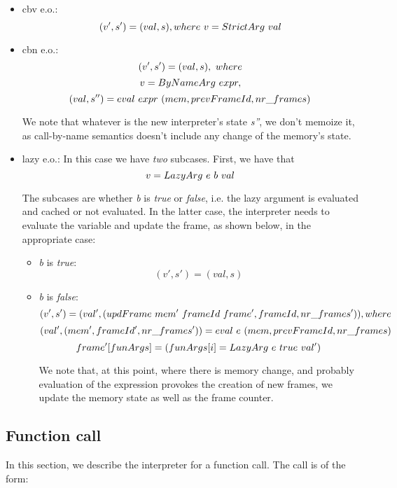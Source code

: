 \documentclass[diploma]{softlab-thesis}
\begin{document}
  \begin{itemize}
    \item cbv e.o.: \[(v', s') = (val, s), where \hfill\ v = StrictArg \hfill\ val\]
    \item cbn e.o.: 
      \[(v', s') = (val, s), \hfill\ where\]
          \[ v = ByNameArg \hfill\ expr,\] 
                \[(val, s'') = eval \hfill\ expr \hfill\ (mem, prevFrameId, nr\_frames)\]
      
      We note that whatever is the new interpreter's state \textit{s''}, we don't memoize it, as call-by-name semantics 
      doesn't include any change of the memory's state.

    \item lazy e.o.: In this case we have \textit{two} subcases. First, we have that 
    \[v = LazyArg \hfill\ e \hfill\ b \hfill\ val\]
    
    The subcases are whether \textit{b} is \textit{true} or \textit{false}, i.e. the lazy argument is evaluated and cached or
    not evaluated. In the latter case, the interpreter needs to evaluate the variable and update the frame, as shown below,
    in the appropriate case:

      \begin{itemize}
        \item \textit{b} is \textit{true}: \[ (v', s') = (val, s) \]
        \item \textit{b} is \textit{false}:
        \[(v', s') = (val', (updFrame \hfill\ mem' \hfill\ frameId \hfill\ frame', frameId, nr\_frames')), where\]
        \[(val', (mem', frameId', nr\_frames')) = eval \hfill\ e \hfill\ (mem, prevFrameId, nr\_frames)\]
        \[frame'[funArgs] = ( funArgs[i] = LazyArg \hfill\ e \hfill\ true \hfill\ val' ) \]

        We note that, at this point, where there is memory change, and probably evaluation of the expression provokes 
        the creation of new frames, we update the memory state as well as the frame counter. 
      \end{itemize}

  \end{itemize}
  
\subsection{Function call}

In this section, we describe the interpreter for a function call. The call is of the form:
\end{document}
